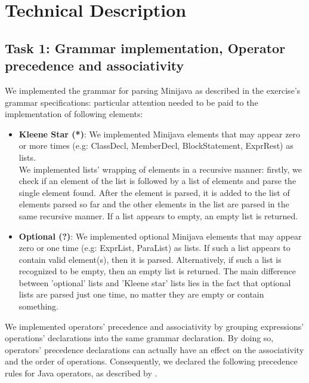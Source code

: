 \documentclass[paper=a4, fontsize=11pt]{scrartcl}
\numberwithin{equation}{section}		%
\numberwithin{figure}{section}			%
\numberwithin{table}{section}				%
\begin{document}
\section*{Technical Description}

\subsection*{Task 1: Grammar implementation, Operator precedence and associativity }
\label{Task1}

We implemented the grammar for parsing Minijava as described in the exercise's grammar specifications: particular attention needed to be paid to the implementation of following elements: 
\begin{itemize}
	\item \textbf{Kleene Star (*)}: We implemented Minijava elements  that may appear zero or more times (e.g: ClassDecl, MemberDecl, BlockStatement, ExprRest) as lists. \\
	We implemented lists' wrapping of elements in a recursive manner: firstly, we check if an element of the list is followed by a list of elements and parse the single element found.  After the element is parsed, it is added to the list of elements parsed so far and the other elements in the list are parsed in the same recursive manner. If a list appears to empty, an empty list is returned. 
	\item \textbf{Optional (?)}: We implemented optional Minijava elements that may appear zero or one time (e.g: ExprList, ParaList) as lists. If such a list appears to contain valid element(s), then it is parsed. Alternatively, if such a list is recognized to be empty, then an empty list is returned. The main difference between 'optional' lists and 'Kleene star' lists lies in the fact that optional lists are parsed just one time, no matter they are empty or contain something. 
\end{itemize}

We implemented operators' precedence and associativity by grouping expressions' operations' declarations into the same grammar declaration. By doing so, operators' precedence declarations can actually have an effect on the associativity and the order of operations. Consequently, we declared the following precedence rules for Java operators, as described by \cite{Princeton}.
\end{document}
